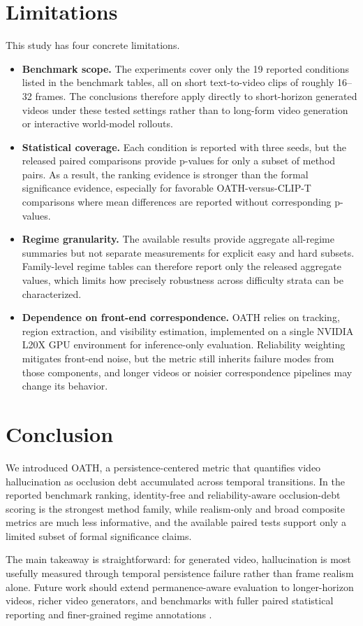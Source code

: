 \documentclass{article}
\begin{document}
\section{Limitations}

This study has four concrete limitations.
\begin{itemize}
    \item \textbf{Benchmark scope.} The experiments cover only the 19 reported conditions listed in the benchmark tables, all on short text-to-video clips of roughly 16--32 frames. The conclusions therefore apply directly to short-horizon generated videos under these tested settings rather than to long-form video generation or interactive world-model rollouts.
    \item \textbf{Statistical coverage.} Each condition is reported with three seeds, but the released paired comparisons provide p-values for only a subset of method pairs. As a result, the ranking evidence is stronger than the formal significance evidence, especially for favorable OATH-versus-CLIP-T comparisons where mean differences are reported without corresponding p-values.
    \item \textbf{Regime granularity.} The available results provide aggregate all-regime summaries but not separate measurements for explicit easy and hard subsets. Family-level regime tables can therefore report only the released aggregate values, which limits how precisely robustness across difficulty strata can be characterized.
    \item \textbf{Dependence on front-end correspondence.} OATH relies on tracking, region extraction, and visibility estimation, implemented on a single NVIDIA L20X GPU environment for inference-only evaluation. Reliability weighting mitigates front-end noise, but the metric still inherits failure modes from those components, and longer videos or noisier correspondence pipelines may change its behavior.
\end{itemize}

\FloatBarrier
\section{Conclusion}

We introduced OATH, a persistence-centered metric that quantifies video hallucination as occlusion debt accumulated across temporal transitions. In the reported benchmark ranking, identity-free and reliability-aware occlusion-debt scoring is the strongest method family, while realism-only and broad composite metrics are much less informative, and the available paired tests support only a limited subset of formal significance claims.

The main takeaway is straightforward: for generated video, hallucination is most usefully measured through temporal persistence failure rather than frame realism alone. Future work should extend permanence-aware evaluation to longer-horizon videos, richer video generators, and benchmarks with fuller paired statistical reporting and finer-grained regime annotations \cite{dreamdojo2026,vbench2024,t2vcompbench2024}.

\FloatBarrier


\end{document}
